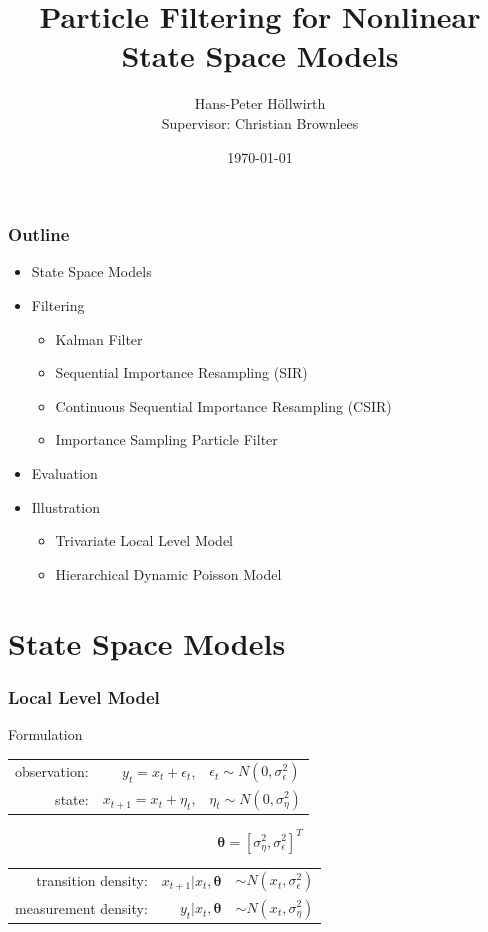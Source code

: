 \documentclass[11pt]{beamer}
\title[Master Project]{Particle Filtering for Nonlinear State Space Models}
\author[]{Hans-Peter H{\"o}llwirth \\ Supervisor: Christian Brownlees}
\institute[BGSE]{Barcelona Graduate School of Economics}
\date{\today}
\begin{document}
\frame{\titlepage}

\begin{frame}
\frametitle{Outline}
\begin{itemize}
\item State Space Models
\item Filtering
	\begin{itemize}
	\item Kalman Filter
	\item Sequential Importance Resampling (SIR)
	\item Continuous Sequential Importance Resampling (CSIR)
	\item Importance Sampling Particle Filter
	\end{itemize}
\item Evaluation
\item Illustration
	\begin{itemize}
	\item Trivariate Local Level Model
	\item Hierarchical Dynamic Poisson Model
	\end{itemize}
\end{itemize}
\end{frame}

\section{State Space Models}

\begin{frame}
\frametitle{Local Level Model}
\begin{block}{Formulation}
\begin{center}
\begin{tabular}{ r r l }
  observation: & $y_t = x_t + \epsilon_t$, & $\epsilon_t \sim N(0,\sigma_{\epsilon}^2)$ \\
  state: & $x_{t+1} = x_t + \eta_t$, & $\eta_t \sim N(0,\sigma_{\eta}^2)$ \\
\end{tabular}
\end{center}
\end{block}
$$
\boldsymbol{\theta} = [\sigma_{\eta}^2,  \sigma_{\epsilon}^2]^T
$$
\begin{center}
\begin{tabular}{ r r l }
  transition density: & $x_{t+1} | x_t, \boldsymbol{\theta}$ & $\sim N(x_t,\sigma_{\epsilon}^2)$ \\
  measurement density: & $y_t | x_t, \boldsymbol{\theta}$ & $\sim N(x_t,\sigma_{\eta}^2)$ \\
\end{tabular}
\end{center}
\end{frame}
\end{document}
